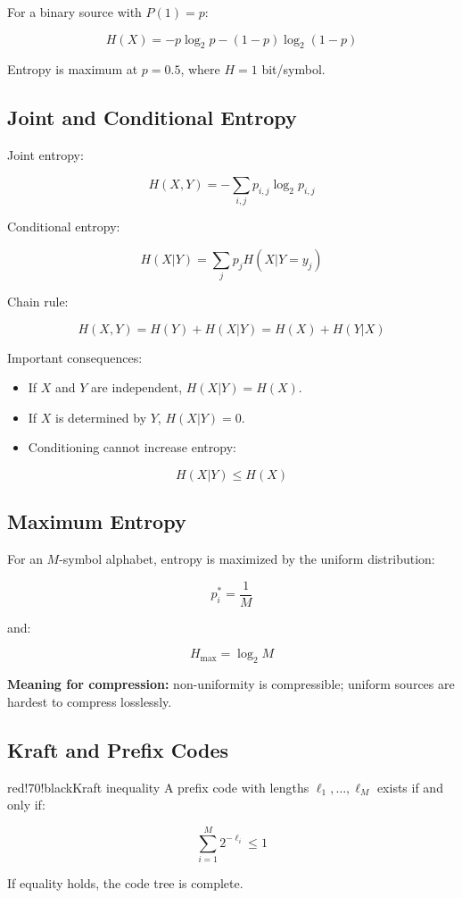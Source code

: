 For a binary source with $P(1)=p$:

\[
H(X)=-p\log_2p-(1-p)\log_2(1-p)
\]

Entropy is maximum at $p=0.5$, where $H=1$ bit/symbol.

\subsection{Joint and Conditional Entropy}

Joint entropy:

\[
H(X,Y)=-\sum_{i,j}p_{i,j}\log_2p_{i,j}
\]

Conditional entropy:

\[
H(X|Y)=\sum_jp_jH(X|Y=y_j)
\]

Chain rule:

\[
H(X,Y)=H(Y)+H(X|Y)=H(X)+H(Y|X)
\]

Important consequences:

\begin{itemize}
  \item If $X$ and $Y$ are independent, $H(X|Y)=H(X)$.
  \item If $X$ is determined by $Y$, $H(X|Y)=0$.
  \item Conditioning cannot increase entropy:
\end{itemize}

\[
H(X|Y)\leq H(X)
\]

\subsection{Maximum Entropy}

For an $M$-symbol alphabet, entropy is maximized by the uniform distribution:

\[
p_i^*=\frac{1}{M}
\]

and:

\[
H_{\max}=\log_2M
\]

\textbf{Meaning for compression:} non-uniformity is compressible; uniform sources are hardest to compress losslessly.

\subsection{Kraft and Prefix Codes}

\begin{calloutbox}{red!70!black}{Kraft inequality}
A prefix code with lengths $\ell_1,\ldots,\ell_M$ exists if and only if:

\[
\sum_{i=1}^{M}2^{-\ell_i}\leq1
\]

If equality holds, the code tree is complete.
\end{calloutbox}

